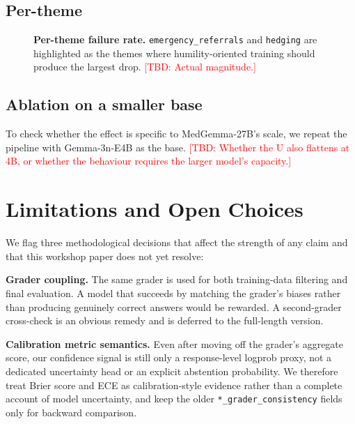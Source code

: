 \documentclass[10pt,letterpaper]{article}
\newcommand{\tbd}[1]{\textcolor{red}{[TBD: #1]}}
\begin{document}
\subsection{Per-theme}

\begin{figure}[t]
  \centering
  \caption{\textbf{Per-theme failure rate.}
  \texttt{emergency\_referrals} and \texttt{hedging} are highlighted
  as the themes where humility-oriented training should produce the
  largest drop. \tbd{Actual magnitude.}}
  \label{fig:themes}
\end{figure}

\subsection{Ablation on a smaller base}
To check whether the effect is specific to MedGemma-27B's scale, we
repeat the pipeline with Gemma-3n-E4B as the base. \tbd{Whether the U
also flattens at 4B, or whether the behaviour requires the larger
model's capacity.}

\section{Limitations and Open Choices}
\label{sec:limitations}

We flag three methodological decisions that affect the strength of any
claim and that this workshop paper does not yet resolve:

\textbf{Grader coupling.} The same grader is used for both training-data
filtering and final evaluation. A model that succeeds by matching the
grader's biases rather than producing genuinely correct answers would be
rewarded. A second-grader cross-check is an obvious remedy and is
deferred to the full-length version.

\textbf{Calibration metric semantics.} Even after moving off the
grader's aggregate score, our confidence signal is still only a
response-level logprob proxy, not a dedicated uncertainty head or an
explicit abstention probability. We therefore treat Brier score and ECE
as calibration-style evidence rather than a complete account of model
uncertainty, and keep the older \texttt{*\_grader\_consistency} fields
only for backward comparison.
\end{document}
